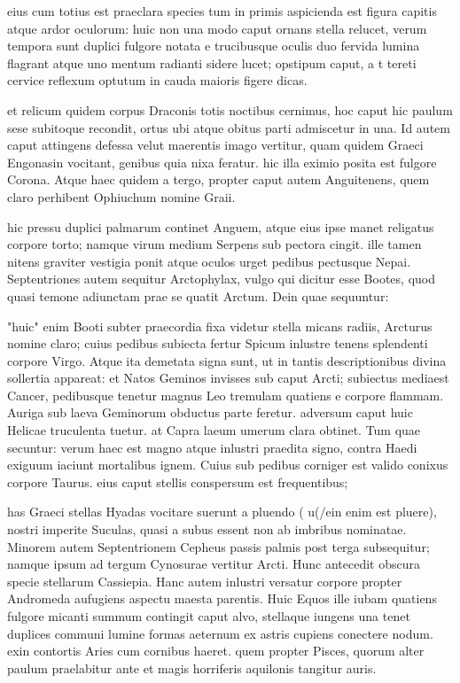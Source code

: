  eius cum totius est praeclara species tum in primis aspicienda est figura capitis atque ardor oculorum: huic non una modo caput ornans stella relucet, verum tempora sunt duplici fulgore notata e trucibusque oculis duo fervida lumina flagrant atque uno mentum radianti sidere lucet; opstipum caput, a t tereti cervice reflexum optutum in cauda maioris figere dicas.

 et relicum quidem corpus Draconis totis noctibus cernimus, hoc caput hic paulum sese subitoque recondit, ortus ubi atque obitus parti admiscetur in una. Id autem caput attingens defessa velut maerentis imago vertitur, quam quidem Graeci Engonasin vocitant, genibus quia nixa feratur. hic illa eximio posita est fulgore Corona. Atque haec quidem a tergo, propter caput autem Anguitenens, quem claro perhibent Ophiuchum nomine Graii.

 hic pressu duplici palmarum continet Anguem, atque eius ipse manet religatus corpore torto; namque virum medium Serpens sub pectora cingit. ille tamen nitens graviter vestigia ponit atque oculos urget pedibus pectusque Nepai. Septentriones autem sequitur Arctophylax, vulgo qui dicitur esse Bootes, quod quasi temone adiunctam prae se quatit Arctum. Dein quae sequuntur:

 "huic" enim Booti subter praecordia fixa videtur stella micans radiis, Arcturus nomine claro; cuius pedibus subiecta fertur Spicum inlustre tenens splendenti corpore Virgo. Atque ita demetata signa sunt, ut in tantis descriptionibus divina sollertia appareat: et Natos Geminos invisses sub caput Arcti; subiectus mediaest Cancer, pedibusque tenetur magnus Leo tremulam quatiens e corpore flammam. Auriga sub laeva Geminorum obductus parte feretur. adversum caput huic Helicae truculenta tuetur. at Capra laeum umerum clara obtinet. Tum quae secuntur: verum haec est magno atque inlustri praedita signo, contra Haedi exiguum iaciunt mortalibus ignem. Cuius sub pedibus corniger est valido conixus corpore Taurus. eius caput stellis conspersum est frequentibus;

 has Graeci stellas Hyadas vocitare suerunt a pluendo ( u(/ein enim est pluere), nostri imperite Suculas, quasi a subus essent non ab imbribus nominatae. Minorem autem Septentrionem Cepheus passis palmis post terga subsequitur; namque ipsum ad tergum Cynosurae vertitur Arcti. Hunc antecedit obscura specie stellarum Cassiepia. Hanc autem inlustri versatur corpore propter Andromeda aufugiens aspectu maesta parentis. Huic Equos ille iubam quatiens fulgore micanti summum contingit caput alvo, stellaque iungens una tenet duplices communi lumine formas aeternum ex astris cupiens conectere nodum. exin contortis Aries cum cornibus haeret. quem propter Pisces, quorum alter paulum praelabitur ante et magis horriferis aquilonis tangitur auris.

